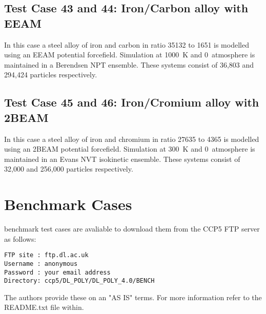 \subsection{Test Case 43 and 44: Iron/Carbon alloy with EEAM}

In this case a steel alloy of iron and carbon in ratio
35132 to 1651 is modelled using an EEAM potential forcefield.
Simulation at 1000~K and 0~atmosphere is maintained in a Berendsen NPT
ensemble.  These systems consist of 36,803 and 294,424
particles respectively.

\subsection{Test Case 45 and 46: Iron/Cromium alloy with 2BEAM}

In this case a steel alloy of iron and chromium in ratio
27635 to 4365 is modelled using an 2BEAM potential forcefield.
Simulation at 300~K and 0~atmosphere is maintained in an Evans NVT
isokinetic ensemble.  These systems consist of 32,000 and 256,000
particles respectively.

\section{Benchmark Cases}

\D benchmark test cases are avaliable to download them from the CCP5 FTP
server as follows:

\begin{verbatim}
FTP site : ftp.dl.ac.uk
Username : anonymous
Password : your email address
Directory: ccp5/DL_POLY/DL_POLY_4.0/BENCH
\end{verbatim}

The \D authors provide these on an "AS IS" terms.  For more information
refer to the README.txt file within.
